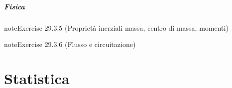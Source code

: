 \documentclass[letterpaper,10pt,italian]{jupyterBook}
\begin{document}
\subsubsection{Fisica}
\label{\detokenize{ch/vector-calculus/problems:fisica}} \label{exercise:ch/vector-calculus/problems-exercise-4}

\begin{sphinxadmonition}{note}{Exercise 29.3.5 (Proprietà inerziali \sphinxhyphen{} massa, centro di massa, momenti)}


\end{sphinxadmonition}
 \label{exercise:ch/vector-calculus/problems-exercise-5}

\begin{sphinxadmonition}{note}{Exercise 29.3.6 (Flusso e circuitazione)}


\end{sphinxadmonition}

\sphinxstepscope


\part{Statistica}

\sphinxstepscope
\end{document}
